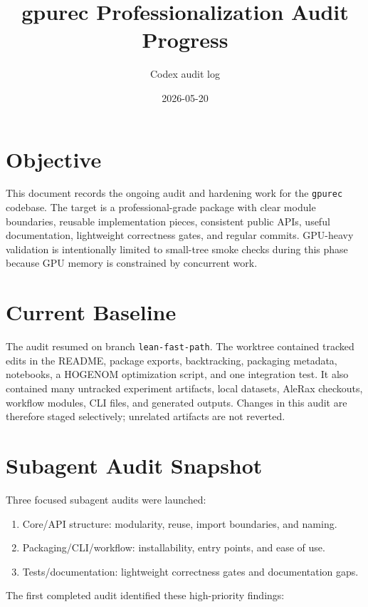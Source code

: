 \documentclass[11pt]{article}
\title{gpurec Professionalization Audit Progress}
\author{Codex audit log}
\date{2026-05-20}
\begin{document}
\maketitle

\section{Objective}

This document records the ongoing audit and hardening work for the
\texttt{gpurec} codebase.  The target is a professional-grade package with
clear module boundaries, reusable implementation pieces, consistent public
APIs, useful documentation, lightweight correctness gates, and regular
commits.  GPU-heavy validation is intentionally limited to small-tree smoke
checks during this phase because GPU memory is constrained by concurrent work.

\section{Current Baseline}

The audit resumed on branch \texttt{lean-fast-path}.  The worktree contained
tracked edits in the README, package exports, backtracking, packaging metadata,
notebooks, a HOGENOM optimization script, and one integration test.  It also
contained many untracked experiment artifacts, local datasets, AleRax checkouts,
workflow modules, CLI files, and generated outputs.  Changes in this audit are
therefore staged selectively; unrelated artifacts are not reverted.

\section{Subagent Audit Snapshot}

Three focused subagent audits were launched:

\begin{enumerate}[leftmargin=*]
  \item Core/API structure: modularity, reuse, import boundaries, and naming.
  \item Packaging/CLI/workflow: installability, entry points, and ease of use.
  \item Tests/documentation: lightweight correctness gates and documentation
        gaps.
\end{enumerate}

The first completed audit identified these high-priority findings:
\end{document}
